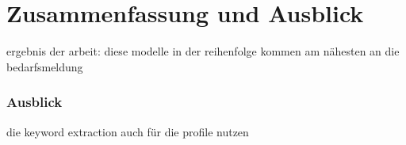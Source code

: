 \chapter{Zusammenfassung und Ausblick}
\label{chap:ergebnisse}

ergebnis der arbeit: diese modelle in der reihenfolge kommen am nähesten an die bedarfsmeldung

\subsection*{Ausblick}
die keyword extraction auch für die profile nutzen 
\newpage
